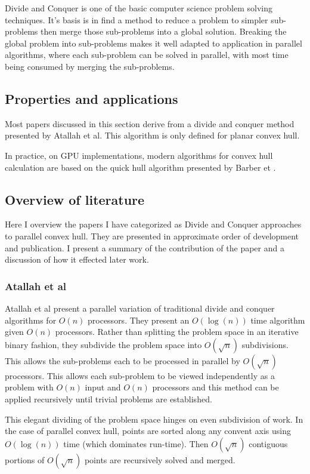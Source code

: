 \documentclass[10pt,a4paper,draft]{report}
\begin{document}
Divide and Conquer is one of the basic computer science problem solving techniques. It's basis is in find a method to reduce a problem to simpler sub-problems then merge those sub-problems into a global solution. Breaking the global problem into sub-problems makes it well adapted to application in parallel algorithms, where each sub-problem can be solved in parallel, with most time being consumed by merging the sub-problems.


\subsection{Properties and applications}

Most papers discussed in this section derive from a divide and conquer method presented by Atallah et al.
This algorithm is only defined for planar convex hull.

In practice, on GPU implementations, modern algorithms for convex hull calculation are based on the quick hull algorithm presented by Barber et .
\subsection{Overview of literature}
Here I overview the papers I have categorized as Divide and Conquer approaches to parallel convex hull. They are presented in approximate order of development and publication. I present a summary of the contribution of the paper and a discussion of how it effected later work.
\subsubsection{Atallah et al}
Atallah et al present a parallel variation of traditional divide and conquer algorithms for $O(n)$ processors. They present an $O(\log(n))$ time algorithm given $O(n)$ processors. Rather than splitting the problem space in an iterative binary fashion, they subdivide the problem space into $O(\sqrt{n})$ subdivisions. This allows the sub-problems each to be processed in parallel by $O(\sqrt{n})$ processors. This allows each sub-problem to be viewed independently as a problem with $O(n)$ input and $O(n)$ processors and this method can be applied recursively until trivial problems are established.

This elegant dividing of the problem space hinges on even subdivision of work. In the case of parallel convex hull, points are sorted along any convent axis using $O(\log(n))$ time (which dominates run-time).
Then $O(\sqrt{n})$ contiguous portions of $O(\sqrt{n})$ points are recursively solved and merged.
\end{document}
